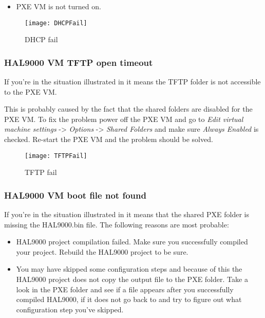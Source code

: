 \begin{appendices}
\begin{itemize}
	\item PXE VM is not turned on.
\end{itemize}

\begin{figure}
	\centering
	\texttt{[image: DHCPFail]}
		\caption{DHCP fail}
	\label{fig:DHCPFail}
\end{figure}

\subsubsection{HAL9000 VM TFTP open timeout}

If you're in the situation illustrated in  it means the TFTP folder is not
accessible to the PXE VM.

This is probably caused by the fact that the shared folders are disabled for the PXE VM. To fix the
problem power off the PXE VM and go to \textit{Edit virtual machine settings} -> \textit{Options} ->
\textit{Shared Folders} and make sure \textit{Always Enabled} is checked. Re-start the PXE VM and the
problem should be solved.

\begin{figure}
	\centering
	\texttt{[image: TFTPFail]}
		\caption{TFTP fail}
	\label{fig:TFTPFail}
\end{figure}

\subsubsection{HAL9000 VM boot file not found}

If you're in the situation illustrated in  it means that the shared
PXE folder is missing the HAL9000.bin file. The following reasons are most probable:
\begin{itemize}
	\item HAL9000 project compilation failed. Make sure you successfully compiled your project.
Rebuild the HAL9000 project to be sure.

	\item You may have skipped some configuration steps and because of this the HAL9000 project does
not copy the output file to the PXE folder. Take a look in the PXE folder and see if a file appears
after you successfully compiled HAL9000, if it does not go back to  and
try to figure out what configuration step you've skipped.
\end{itemize}


\end{appendices}
